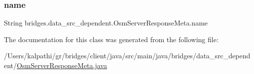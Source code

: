 \subsubsection{\texorpdfstring{name}{name}}
{\footnotesize\ttfamily String bridges.\+data\+\_\+src\+\_\+dependent.\+Osm\+Server\+Response\+Meta.\+name}



The documentation for this class was generated from the following file\+:\begin{DoxyCompactItemize}
\item 
/\+Users/kalpathi/gr/bridges/client/java/src/main/java/bridges/data\+\_\+src\+\_\+dependent/\mbox{\hyperlink{_osm_server_response_meta_8java}{Osm\+Server\+Response\+Meta.\+java}}\end{DoxyCompactItemize}
